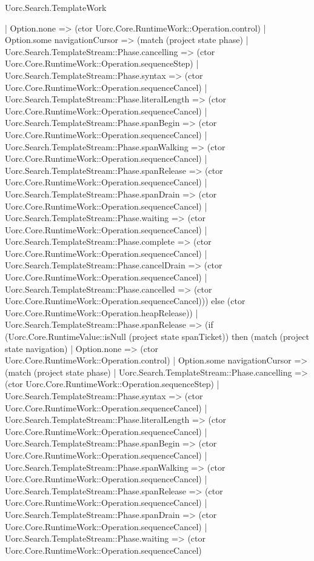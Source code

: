 \begin{lexlean}{Uorc.Search.TemplateWork}
\begin{semanticmodule}
{      | Option.none => (ctor Uorc.Core.RuntimeWork::Operation.control)
      | Option.some navigationCursor => (match (project state phase)
        | Uorc.Search.TemplateStream::Phase.cancelling => (ctor Uorc.Core.RuntimeWork::Operation.sequenceStep)
        | Uorc.Search.TemplateStream::Phase.syntax => (ctor Uorc.Core.RuntimeWork::Operation.sequenceCancel)
        | Uorc.Search.TemplateStream::Phase.literalLength => (ctor Uorc.Core.RuntimeWork::Operation.sequenceCancel)
        | Uorc.Search.TemplateStream::Phase.spanBegin => (ctor Uorc.Core.RuntimeWork::Operation.sequenceCancel)
        | Uorc.Search.TemplateStream::Phase.spanWalking => (ctor Uorc.Core.RuntimeWork::Operation.sequenceCancel)
        | Uorc.Search.TemplateStream::Phase.spanRelease => (ctor Uorc.Core.RuntimeWork::Operation.sequenceCancel)
        | Uorc.Search.TemplateStream::Phase.spanDrain => (ctor Uorc.Core.RuntimeWork::Operation.sequenceCancel)
        | Uorc.Search.TemplateStream::Phase.waiting => (ctor Uorc.Core.RuntimeWork::Operation.sequenceCancel)
        | Uorc.Search.TemplateStream::Phase.complete => (ctor Uorc.Core.RuntimeWork::Operation.sequenceCancel)
        | Uorc.Search.TemplateStream::Phase.cancelDrain => (ctor Uorc.Core.RuntimeWork::Operation.sequenceCancel)
        | Uorc.Search.TemplateStream::Phase.cancelled => (ctor Uorc.Core.RuntimeWork::Operation.sequenceCancel))) else (ctor Uorc.Core.RuntimeWork::Operation.heapRelease))
    | Uorc.Search.TemplateStream::Phase.spanRelease => (if (Uorc.Core.RuntimeValue::isNull (project state spanTicket)) then (match (project state navigation)
      | Option.none => (ctor Uorc.Core.RuntimeWork::Operation.control)
      | Option.some navigationCursor => (match (project state phase)
        | Uorc.Search.TemplateStream::Phase.cancelling => (ctor Uorc.Core.RuntimeWork::Operation.sequenceStep)
        | Uorc.Search.TemplateStream::Phase.syntax => (ctor Uorc.Core.RuntimeWork::Operation.sequenceCancel)
        | Uorc.Search.TemplateStream::Phase.literalLength => (ctor Uorc.Core.RuntimeWork::Operation.sequenceCancel)
        | Uorc.Search.TemplateStream::Phase.spanBegin => (ctor Uorc.Core.RuntimeWork::Operation.sequenceCancel)
        | Uorc.Search.TemplateStream::Phase.spanWalking => (ctor Uorc.Core.RuntimeWork::Operation.sequenceCancel)
        | Uorc.Search.TemplateStream::Phase.spanRelease => (ctor Uorc.Core.RuntimeWork::Operation.sequenceCancel)
        | Uorc.Search.TemplateStream::Phase.spanDrain => (ctor Uorc.Core.RuntimeWork::Operation.sequenceCancel)
        | Uorc.Search.TemplateStream::Phase.waiting => (ctor Uorc.Core.RuntimeWork::Operation.sequenceCancel)
}
\end{semanticmodule}
\end{lexlean}
